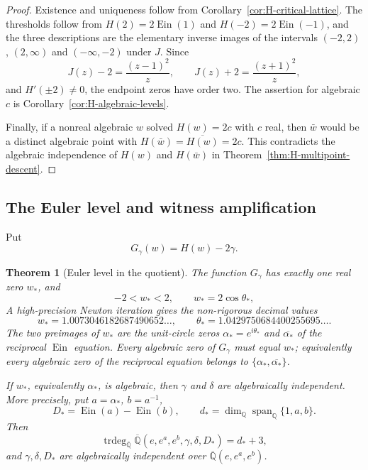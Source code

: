\documentclass[11pt]{article}
\newtheorem{theorem}{Theorem}[section]
\theoremstyle{definition}
\theoremstyle{remark}
\newcommand{\Q}{\mathbb Q}
\newcommand{\Qbar}{\overline{\mathbb Q}}
\newcommand{\Ein}{\operatorname{Ein}}
\newcommand{\Span}{\operatorname{span}}
\begin{document}
\begin{proof}
Existence and uniqueness follow from Corollary~\ref{cor:H-critical-lattice}.
The thresholds follow from
$H(2)=2\Ein(1)$ and $H(-2)=2\Ein(-1)$, and the three descriptions are the
elementary inverse images of the intervals $(-2,2)$, $(2,\infty)$ and
$(-\infty,-2)$ under $J$.  Since
\[
 J(z)-2=\frac{(z-1)^2}{z},\qquad
 J(z)+2=\frac{(z+1)^2}{z},
\]
and $H'(\pm2)\ne0$, the endpoint zeros have order two.  The assertion for
algebraic $c$ is Corollary~\ref{cor:H-algebraic-levels}.

Finally, if a nonreal algebraic $w$ solved $H(w)=2c$ with $c$ real, then
$\bar w$ would be a distinct algebraic point with
$H(\bar w)=\overline{H(w)}=2c$.  This contradicts the algebraic
independence of $H(w)$ and $H(\bar w)$ in
Theorem~\ref{thm:H-multipoint-descent}.
\end{proof}

\subsection{The Euler level and witness amplification}

Put
\[
 G_\gamma(w)=H(w)-2\gamma.
\]

\begin{theorem}[Euler level in the quotient]
\label{thm:H-euler-level}
The function $G_\gamma$ has exactly one real zero $w_*$, and
\begin{equation}\label{eq:w-star-location}
 -2<w_*<2,\qquad w_*=2\cos\theta_*,
\end{equation}
A high-precision Newton iteration gives the non-rigorous decimal values
\[
 w_*=1.0073046182687490652\ldots,
 \qquad \theta_*=1.0429750684400255695\ldots.
\]
The two preimages of $w_*$ are the unit-circle zeros
$\alpha_*=e^{i\theta_*}$ and $\overline{\alpha_*}$ of the reciprocal
$\Ein$ equation.  Every algebraic zero of $G_\gamma$ must equal $w_*$;
equivalently every algebraic zero of the reciprocal equation belongs to
$\{\alpha_*,\overline{\alpha_*}\}$.

If $w_*$, equivalently $\alpha_*$, is algebraic, then $\gamma$ and
$\delta$ are algebraically independent.  More precisely, put
$a=\alpha_*$, $b=a^{-1}$,
\[
 D_*=\Ein(a)-\Ein(b),\qquad
 d_*=\dim_{\Q}\Span_{\Q}\{1,a,b\}.
\]
Then
\begin{equation}\label{eq:witness-amplification}
 \operatorname{trdeg}_{\Qbar}
 \Qbar(e,e^a,e^b,\gamma,\delta,D_*)=d_*+3,
\end{equation}
and $\gamma,\delta,D_*$ are algebraically independent over
$\Qbar(e,e^a,e^b)$.
\end{theorem}
\end{document}

